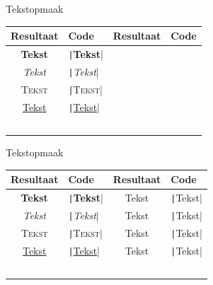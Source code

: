 
\begin{frame}{Tekstopmaak}
	\begin{tabular}{c p{4.1cm} | c p{3cm}}
		Resultaat & Code  & Resultaat & Code \\
		\hline
		\textbf{Tekst} & \texttt|\textbf{Tekst}|  &  &  \\
		\textit{Tekst} & \texttt|\textit{Tekst}| &  &  \\
		\textsc{Tekst} & \texttt|\textsc{Tekst}|  &  &  \\
		\underline{Tekst} & \texttt|\underline{Tekst}|  &  & \\
		\hline
		&   & & \\
		&    & & \\
		&   & & \\
		&  & & \\
		&   & &\\
	\end{tabular}
\end{frame}

\begin{frame}{Tekstopmaak}
	\begin{tabular}{c p{4.1cm} | c p{3cm}}
		Resultaat & Code  & Resultaat & Code \\
		\hline
		\textbf{Tekst} & \texttt|\textbf{Tekst}|  & {\tiny Tekst} & \texttt|{\tiny Tekst}| \\
		\textit{Tekst} & \texttt|\textit{Tekst}| & {\small Tekst} & \texttt|{\small Tekst}| \\
		\textsc{Tekst} & \texttt|\textsc{Tekst}|  & {\large Tekst} & \texttt|{\large Tekst}| \\
		\underline{Tekst} & \texttt|\underline{Tekst}|  & {\huge Tekst} & \texttt|{\huge Tekst}| \\
		\hline
		&   & & \\
		&    & & \\
		&   & & \\
		&  & & \\
		&   & &\\
	\end{tabular}
\end{frame}


